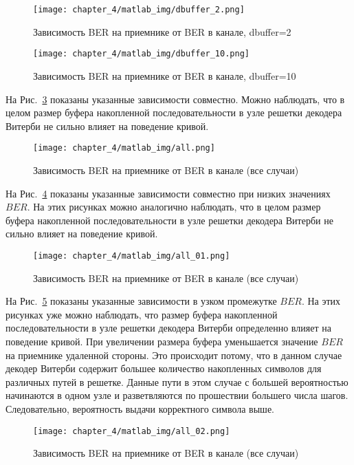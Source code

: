 \begin{figure}[h]
\begin{center}
\texttt{[image: chapter\_4/matlab\_img/dbuffer\_2.png]}
\caption{Зависимость BER на приемнике от BER в канале, dbuffer=2}
\label{img_07}
\end{center}
\end{figure}

\begin{figure}[h]
\begin{center}
\texttt{[image: chapter\_4/matlab\_img/dbuffer\_10.png]}
\caption{Зависимость BER на приемнике от BER в канале, dbuffer=10}
\label{img_08}
\end{center}
\end{figure}

На Рис.~\ref{img_09} показаны указанные зависимости совместно. Можно наблюдать, что в целом размер буфера накопленной
последовательности в узле решетки декодера Витерби не сильно влияет на поведение кривой.
\begin{figure}[h]
\begin{center}
\texttt{[image: chapter\_4/matlab\_img/all.png]}
\caption{Зависимость BER на приемнике от BER в канале (все случаи)}
\label{img_09}
\end{center}
\end{figure}

На Рис.~\ref{img_10} показаны указанные зависимости совместно при низких значениях $BER$. На этих рисунках можно аналогично
наблюдать, что в целом размер буфера накопленной последовательности в узле решетки декодера Витерби не сильно влияет на поведение кривой.
\begin{figure}[h]
\begin{center}
\texttt{[image: chapter\_4/matlab\_img/all\_01.png]}
\caption{Зависимость BER на приемнике от BER в канале (все случаи)}
\label{img_10}
\end{center}
\end{figure}

На Рис.~\ref{img_11} показаны указанные зависимости в узком промежутке $BER$. На этих рисунках уже можно наблюдать, что размер буфера
накопленной последовательности в узле решетки декодера Витерби определенно влияет на поведение кривой. При увеличении размера
буфера уменьшается значение $BER$ на приемнике удаленной стороны. Это происходит потому, что в данном случае декодер Витерби
содержит большее количество накопленных символов для различных путей в решетке. Данные пути в этом случае с большей вероятностью
начинаются в одном узле и разветвляются по прошествии большего числа шагов. Следовательно, вероятность выдачи корректного символа выше.
\begin{figure}[h]
\begin{center}
\texttt{[image: chapter\_4/matlab\_img/all\_02.png]}
\caption{Зависимость BER на приемнике от BER в канале (все случаи)}
\label{img_11}
\end{center}
\end{figure}

